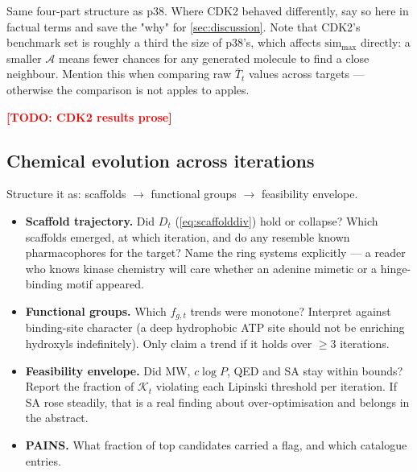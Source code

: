 \documentclass[11pt]{article}
\newcommand{\TODO}[1]{\textcolor{red}{\textbf{[TODO: #1]}}}
\newcommand{\Actives}{\mathcal{A}}              %
\newcommand{\TopK}{\mathcal{K}}                 %
\newcommand{\simmax}{\mathrm{sim}_{\max}}
\newcommand{\Tbar}{\bar{T}}
\begin{document}
\begin{yourturn}
Same four-part structure as p38. Where CDK2 behaved differently, say so here in
factual terms and save the "why" for \cref{sec:discussion}. Note that CDK2's
benchmark set is roughly a third the size of p38's, which affects $\simmax$
directly: a smaller $\Actives$ means fewer chances for any generated molecule to
find a close neighbour. Mention this when comparing raw $\Tbar_t$ values across
targets --- otherwise the comparison is not apples to apples.
\end{yourturn}

\TODO{CDK2 results prose}

\subsection{Chemical evolution across iterations}
\label{sec:results:chem}

\begin{yourturn}
Structure it as: scaffolds $\rightarrow$ functional groups $\rightarrow$
feasibility envelope.
\begin{itemize}\itemsep0pt
  \item \textbf{Scaffold trajectory.} Did $D_t$ (\cref{eq:scaffolddiv}) hold or
        collapse? Which scaffolds emerged, at which iteration, and do any
        resemble known pharmacophores for the target? Name the ring systems
        explicitly --- a reader who knows kinase chemistry will care whether an
        adenine mimetic or a hinge-binding motif appeared.
  \item \textbf{Functional groups.} Which $f_{g,t}$ trends were monotone?
        Interpret against binding-site character (a deep hydrophobic ATP site
        should not be enriching hydroxyls indefinitely). Only claim a trend if
        it holds over $\ge 3$ iterations.
  \item \textbf{Feasibility envelope.} Did MW, $c\log P$, QED and SA stay within
        bounds? Report the fraction of $\TopK_t$ violating each Lipinski
        threshold per iteration. If SA rose steadily, that is a real finding
        about over-optimisation and belongs in the abstract.
  \item \textbf{PAINS.} What fraction of top candidates carried a flag, and
        which catalogue entries.
\end{itemize}
\end{yourturn}
\end{document}
